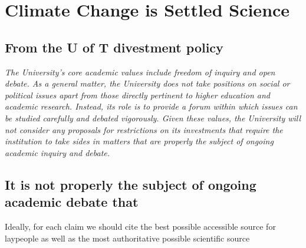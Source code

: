 
		\section{Climate Change is Settled Science}


	
	\subsection{From the U of T divestment policy}


	
\emph{The University’s core academic values include freedom of inquiry and open debate.
As a general matter, the University does not take positions on social or political issues apart from those directly pertinent to higher education and academic research. 
Instead, its role is to provide a forum within which issues can be studied carefully and debated vigorously. 
Given these values, the University will not consider any proposals for restrictions on its investments that require the institution to take sides in matters that are properly the subject of ongoing academic inquiry and debate.}



	\subsection{It is not properly the subject of ongoing academic debate that}



\textsf{Ideally, for each claim we should cite the best possible accessible source for laypeople as well as the most authoritative possible scientific source}

